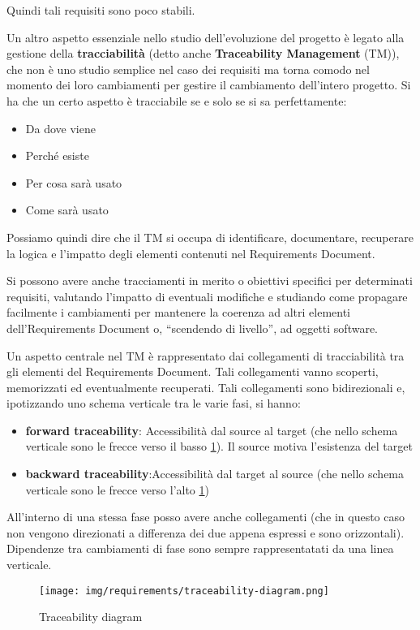 Quindi tali requisiti sono poco stabili.

Un altro aspetto essenziale nello studio dell'evoluzione del progetto è legato
alla gestione della \textbf{tracciabilità} (detto anche \textbf{Traceability Management}
(TM)), che non è uno studio semplice nel caso dei requisiti ma torna comodo nel
momento dei loro cambiamenti per gestire il cambiamento dell'intero progetto. Si ha
che un certo aspetto è tracciabile se e solo se si sa perfettamente:
\begin{itemize}
    \item Da dove viene
    \item Perché esiste
    \item Per cosa sarà usato
    \item Come sarà usato
\end{itemize}
Possiamo quindi dire che il TM si occupa di identificare, documentare, recuperare
la logica e l'impatto degli elementi contenuti nel Requirements Document.

Si possono avere anche tracciamenti in merito o obiettivi specifici per determinati
requisiti, valutando l'impatto di eventuali modifiche e studiando come propagare
facilmente i cambiamenti per mantenere la coerenza ad altri elementi
dell'Requirements Document o, “scendendo di livello”, ad oggetti software.

Un aspetto centrale nel TM è rappresentato dai collegamenti di tracciabilità tra
gli elementi del Requirements Document. Tali collegamenti vanno scoperti,
memorizzati ed eventualmente recuperati. Tali collegamenti sono bidirezionali e,
ipotizzando uno schema verticale tra le varie fasi, si hanno:
\begin{itemize}
    \item \textbf{forward traceability}: Accessibilità dal source al target
          (che nello schema verticale sono le frecce verso il basso \ref{fig:traceability-diagram}). 
          Il source motiva l'esistenza del target
    \item \textbf{backward traceability}:Accessibilità dal target al source
          (che nello schema verticale sono le frecce verso l'alto \ref{fig:traceability-diagram})
\end{itemize}
All'interno di una stessa fase posso avere anche collegamenti (che in questo caso
non vengono direzionati a differenza dei due appena espressi e sono orizzontali).
Dipendenze tra cambiamenti di fase sono sempre rappresentatati da una linea verticale.

\begin{figure}[!ht]
      \centering
      \texttt{[image: img/requirements/traceability-diagram.png]}
      \caption{Traceability diagram}
      \label{fig:traceability-diagram}
\end{figure}

